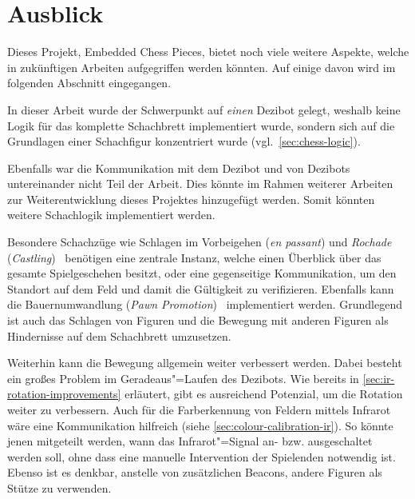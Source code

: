 
\section{Ausblick}
\label{sec:perspective}

Dieses Projekt, Embedded Chess Pieces, bietet noch viele weitere Aspekte, welche in zukünftigen Arbeiten aufgegriffen werden könnten. Auf einige davon wird im folgenden Abschnitt eingegangen.


In dieser Arbeit wurde der Schwerpunkt auf \emph{einen} Dezibot gelegt, weshalb keine Logik für das komplette Schachbrett implementiert wurde, sondern sich auf die Grundlagen einer Schachfigur konzentriert wurde (vgl.~\autoref{sec:chess-logic}).


Ebenfalls war die Kommunikation mit dem Dezibot und von Dezibots untereinander nicht Teil der Arbeit. Dies könnte im Rahmen weiterer Arbeiten zur Weiterentwicklung dieses Projektes hinzugefügt werden. Somit könnten weitere Schachlogik implementiert werden.


Besondere Schachzüge wie Schlagen im Vorbeigehen (\emph{en passant}) und \emph{Rochade} (\emph{Castling})~\cite{justUSChessFederations2019} benötigen eine zentrale Instanz, welche einen Überblick über das gesamte Spielgeschehen besitzt, oder eine gegenseitige Kommunikation, um den Standort auf dem Feld und damit die Gültigkeit zu verifizieren. Ebenfalls kann die Bauernumwandlung (\emph{Pawn Promotion})~\cite{justUSChessFederations2019} implementiert werden. Grundlegend ist auch das Schlagen von Figuren und die Bewegung mit anderen Figuren als Hindernisse auf dem Schachbrett umzusetzen.


Weiterhin kann die Bewegung allgemein weiter verbessert werden. Dabei besteht ein großes Problem im Geradeaus"=Laufen des Dezibots. Wie bereits in \autoref{sec:ir-rotation-improvements} erläutert, gibt es ausreichend Potenzial, um die Rotation weiter zu verbessern. Auch für die Farberkennung von Feldern mittels Infrarot wäre eine Kommunikation hilfreich (siehe \autoref{sec:colour-calibration-ir}). So könnte jenen mitgeteilt werden, wann das Infrarot"=Signal an- bzw. ausgeschaltet werden soll, ohne dass eine manuelle Intervention der Spielenden notwendig ist. Ebenso ist es denkbar, anstelle von zusätzlichen Beacons, andere Figuren als Stütze zu verwenden.

